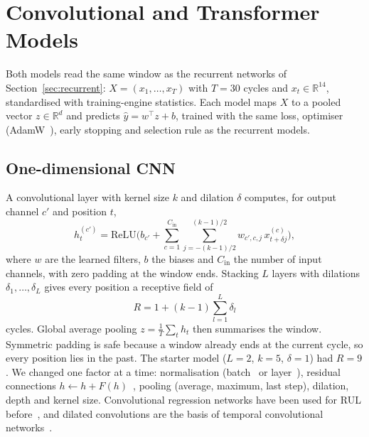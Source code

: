 \section{Convolutional and Transformer Models}
\label{sec:cnn_transformer}

Both models read the same window as the recurrent networks of Section~\ref{sec:recurrent}: $X=(x_1,\dots,x_T)$ with $T=30$ cycles and $x_t\in\mathbb{R}^{14}$, standardised with training-engine statistics.  Each model maps $X$ to a pooled vector $z\in\mathbb{R}^{d}$ and predicts $\hat y=w^\top z+b$, trained with the same loss, optimiser (AdamW~\cite{loshchilov_2019_adamw}), early stopping and selection rule as the recurrent models.

\subsection{One-dimensional CNN}
A convolutional layer with kernel size $k$ and dilation $\delta$ computes, for output channel $c'$ and position $t$,
\begin{equation}
h^{(c')}_t=\mathrm{ReLU}\!\Big(b_{c'}+\sum_{c=1}^{C_{\mathrm{in}}}\sum_{j=-(k-1)/2}^{(k-1)/2} w_{c',c,j}\,x^{(c)}_{t+\delta j}\Big),
\end{equation}
where $w$ are the learned filters, $b$ the biases and $C_{\mathrm{in}}$ the number of input channels, with zero padding at the window ends.  Stacking $L$ layers with dilations $\delta_1,\dots,\delta_L$ gives every position a receptive field of
\begin{equation}
R=1+(k-1)\sum_{l=1}^{L}\delta_l
\end{equation}
cycles.  Global average pooling $z=\frac{1}{T}\sum_{t}h_t$ then summarises the window.  Symmetric padding is safe because a window already ends at the current cycle, so every position lies in the past.  The starter model ($L=2$, $k=5$, $\delta=1$) had $R=9$.  We changed one factor at a time: normalisation (batch~\cite{ioffe_2015_batchnorm} or layer~\cite{ba_2016_layernorm}), residual connections $h\leftarrow h+F(h)$~\cite{he_2016_resnet}, pooling (average, maximum, last step), dilation, depth and kernel size.  Convolutional regression networks have been used for RUL before~\cite{babu_2016_dcnn,li_2018_dcnn}, and dilated convolutions are the basis of temporal convolutional networks~\cite{bai_2018_tcn}.

